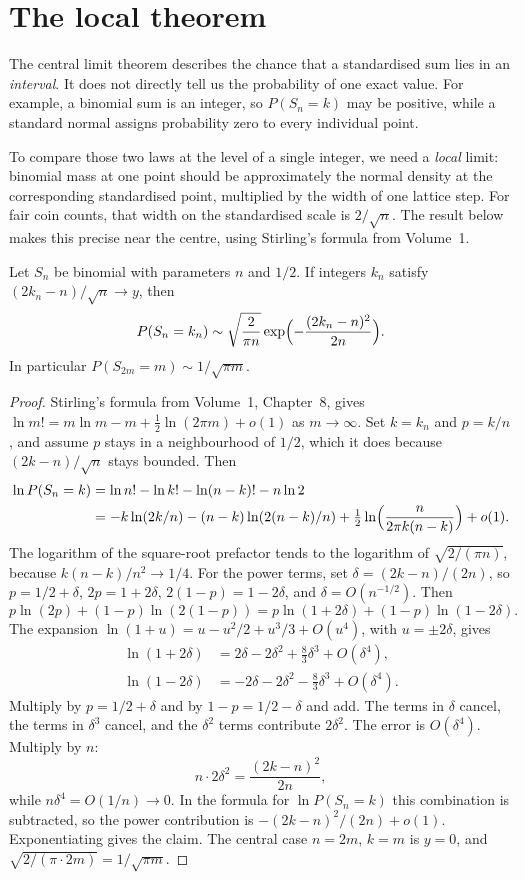 \section{The local theorem}

The central limit theorem describes the chance that a standardised sum lies in an \emph{interval}. It does not directly tell us the probability of one exact value. For example, a binomial sum is an integer, so $P(S_n=k)$ may be positive, while a standard normal assigns probability zero to every individual point.

To compare those two laws at the level of a single integer, we need a \emph{local} limit: binomial mass at one point should be approximately the normal density at the corresponding standardised point, multiplied by the width of one lattice step. For fair coin counts, that width on the standardised scale is $2/\sqrt n$. The result below makes this precise near the centre, using Stirling's formula from Volume~1.

\begin{theorem}\label{thm:local}
Let $S_n$ be binomial with parameters $n$ and $1/2$. If integers $k_n$ satisfy $(2k_n-n)/\sqrt n\to y$, then
\[
 P(S_n=k_n)\sim\sqrt{\frac{2}{\pi n}}\exp\Bigl(-\frac{(2k_n-n)^2}{2n}\Bigr).
\]
In particular $P(S_{2m}=m)\sim 1/\sqrt{\pi m}$.
\end{theorem}
\begin{proof}
Stirling's formula from Volume~1, Chapter~8, gives $\ln m!=m\ln m-m+\tfrac12\ln(2\pi m)+o(1)$ as $m\to\infty$. Set $k=k_n$ and $p=k/n$, and assume $p$ stays in a neighbourhood of $1/2$, which it does because $(2k-n)/\sqrt n$ stays bounded. Then
\begin{align*}
\ln P(S_n=k)
&= \ln n!-\ln k!-\ln(n-k)!-n\ln 2\\
&= -k\ln(2k/n)-(n-k)\ln(2(n-k)/n)+\tfrac12\ln\Bigl(\frac{n}{2\pi k(n-k)}\Bigr)+o(1).
\end{align*}
The logarithm of the square-root prefactor tends to the logarithm of $\sqrt{2/(\pi n)}$, because $k(n-k)/n^2\to1/4$. For the power terms, set $\delta=(2k-n)/(2n)$, so $p=1/2+\delta$, $2p=1+2\delta$, $2(1-p)=1-2\delta$, and $\delta=O(n^{-1/2})$. Then
\[
 p\ln(2p)+(1-p)\ln(2(1-p))=p\ln(1+2\delta)+(1-p)\ln(1-2\delta).
\]
The expansion $\ln(1+u)=u-u^2/2+u^3/3+O(u^4)$, with $u=\pm2\delta$, gives
\begin{align*}
\ln(1+2\delta)&=2\delta-2\delta^2+\tfrac83\delta^3+O(\delta^4),\\
\ln(1-2\delta)&=-2\delta-2\delta^2-\tfrac83\delta^3+O(\delta^4).
\end{align*}
Multiply by $p=1/2+\delta$ and by $1-p=1/2-\delta$ and add. The terms in $\delta$ cancel, the terms in $\delta^3$ cancel, and the $\delta^2$ terms contribute $2\delta^2$. The error is $O(\delta^4)$. Multiply by $n$:
\[
 n\cdot 2\delta^2=\frac{(2k-n)^2}{2n},
\]
while $n\delta^4=O(1/n)\to0$. In the formula for $\ln P(S_n=k)$ this combination is subtracted, so the power contribution is $-(2k-n)^2/(2n)+o(1)$. Exponentiating gives the claim. The central case $n=2m$, $k=m$ is $y=0$, and $\sqrt{2/(\pi\cdot 2m)}=1/\sqrt{\pi m}$.
\end{proof}

